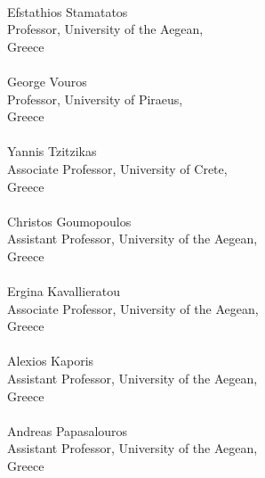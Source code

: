 \documentclass[
    12pt, %
    singlespacing, %
    headsepline, %
]{DoctoralThesis} %
\begin{document}
\begin{center}
\vspace*{.06\textheight}

\HRule\\
Efstathios Stamatatos\\
Professor, University of the Aegean,\\
Greece\\

\HRule\\
George Vouros\\
Professor, University of Piraeus,\\
Greece\\

\HRule\\
Yannis Tzitzikas\\
Associate Professor, University of Crete,\\
Greece\\

\HRule\\
Christos Goumopoulos\\
Assistant Professor, University of the Aegean,\\
Greece\\

\HRule\\
Ergina Kavallieratou\\
Associate Professor, University of the Aegean,\\
Greece\\

\HRule\\
Alexios Kaporis\\
Assistant Professor, University of the Aegean,\\
Greece\\

\HRule \\
Andreas Papasalouros\\
Assistant Professor, University of the Aegean,\\
Greece\\

\HRule \\[0.3cm] %

\end{center}


\newpage


\end{document}
